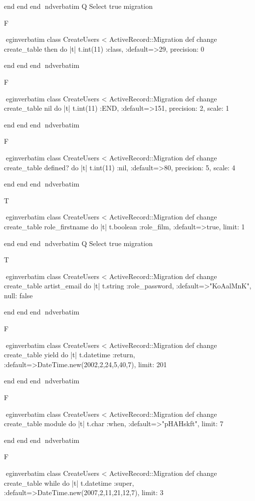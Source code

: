     end 
  end 
end
nd{verbatim}
Q
 Select true migration

F

egin{verbatim}
 class CreateUsers < ActiveRecord::Migration 
  def change 
    create_table then do |t| 
      t.int(11) :class, :default=>29, precision: 0
    
    end 
  end 
end
nd{verbatim}

F

egin{verbatim}
 class CreateUsers < ActiveRecord::Migration 
  def change 
    create_table nil do |t| 
      t.int(11) :END, :default=>151, precision: 2, scale: 1
    
    end 
  end 
end
nd{verbatim}

F

egin{verbatim}
 class CreateUsers < ActiveRecord::Migration 
  def change 
    create_table defined? do |t| 
      t.int(11) :nil, :default=>80, precision: 5, scale: 4
    
    end 
  end 
end
nd{verbatim}

T

egin{verbatim}
 class CreateUsers < ActiveRecord::Migration 
  def change 
    create_table role_firstname do |t| 
      t.boolean :role_film, :default=>true, limit: 1
    
    end 
  end 
end
nd{verbatim}
Q
 Select true migration

T

egin{verbatim}
 class CreateUsers < ActiveRecord::Migration 
  def change 
    create_table artist_email do |t| 
      t.string :role_password, :default=>"KoAalMnK", null: false
    
    end 
  end 
end
nd{verbatim}

F

egin{verbatim}
 class CreateUsers < ActiveRecord::Migration 
  def change 
    create_table yield do |t| 
      t.datetime :return, :default=>DateTime.new(2002,2,24,5,40,7), limit: 201
    
    end 
  end 
end
nd{verbatim}

F

egin{verbatim}
 class CreateUsers < ActiveRecord::Migration 
  def change 
    create_table module do |t| 
      t.char :when, :default=>"pHAHskft", limit: 7
    
    end 
  end 
end
nd{verbatim}

F

egin{verbatim}
 class CreateUsers < ActiveRecord::Migration 
  def change 
    create_table while do |t| 
      t.datetime :super, :default=>DateTime.new(2007,2,11,21,12,7), limit: 3
    
